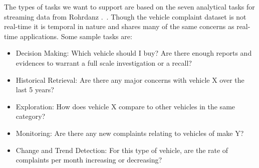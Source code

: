 The types of tasks we want to support are based on the seven analytical tasks for streaming 
data from Rohrdanz \etal.~\cite{ROH2011a}. Though the vehicle complaint dataset is not real-time it is temporal in nature
and shares many of the same concerns as real-time applications. Some sample 
tasks are:

\begin{itemize}[noitemsep]
   \item Decision Making: Which vehicle should I buy? Are there enough
   reports and evidences to warrant a full scale investigation or a recall?
   \item Historical Retrieval: Are there any major concerns with vehicle X over the last 5 years?
   \item Exploration: How does vehicle X compare to other vehicles in the same category?
   \item Monitoring: Are there any new complaints relating to vehicles of make Y?
   \item Change and Trend Detection: For this type of vehicle, are the rate of complaints per month increasing or decreasing?
\end{itemize}


